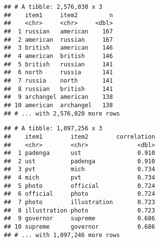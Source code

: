 \documentclass[]{article}
\newenvironment{Shaded}{\begin{snugshade}}{\end{snugshade}}
\newcommand{\DataTypeTok}[1]{\textcolor[rgb]{0.13,0.29,0.53}{#1}}
\newcommand{\DecValTok}[1]{\textcolor[rgb]{0.00,0.00,0.81}{#1}}
\newcommand{\KeywordTok}[1]{\textcolor[rgb]{0.13,0.29,0.53}{\textbf{#1}}}
\newcommand{\NormalTok}[1]{#1}
\newcommand{\OperatorTok}[1]{\textcolor[rgb]{0.81,0.36,0.00}{\textbf{#1}}}
\newcommand{\OtherTok}[1]{\textcolor[rgb]{0.56,0.35,0.01}{#1}}
\newcommand{\StringTok}[1]{\textcolor[rgb]{0.31,0.60,0.02}{#1}}
\begin{document}
\begin{Shaded}
\end{Shaded}

\begin{verbatim}
## # A tibble: 2,576,030 x 3
##    item1     item2         n
##    <chr>     <chr>     <dbl>
##  1 russian   american    167
##  2 american  russian     167
##  3 british   american    146
##  4 american  british     146
##  5 british   russian     141
##  6 north     russia      141
##  7 russia    north       141
##  8 russian   british     141
##  9 archangel american    138
## 10 american  archangel   138
## # ... with 2,576,020 more rows
\end{verbatim}

\begin{Shaded}
\end{Shaded}

\begin{verbatim}
## # A tibble: 1,097,256 x 3
##    item1        item2        correlation
##    <chr>        <chr>              <dbl>
##  1 padenga      ust                0.910
##  2 ust          padenga            0.910
##  3 pvt          mich               0.734
##  4 mich         pvt                0.734
##  5 photo        official           0.724
##  6 official     photo              0.724
##  7 photo        illustration       0.723
##  8 illustration photo              0.723
##  9 governor     supreme            0.686
## 10 supreme      governor           0.686
## # ... with 1,097,246 more rows
\end{verbatim}
\end{document}
